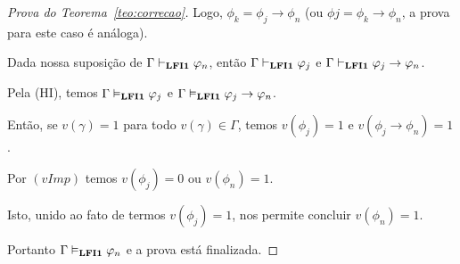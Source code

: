 \begin{proof}[Prova do Teorema~\ref{teo:correcao}]
         Logo, $\phi_{k} = \phi_{j} \to \phi_{n}$ (ou $\phi{j} = \phi_{k} \to \phi_{n}$, a prova para este caso é análoga). 
         
         Dada nossa suposição de $\Gamma \vdash_{\textbf{LFI1}{}} \varphi_{n}$, então $\Gamma \vdash_{\textbf{LFI1}{}} \varphi_{j}$ e $\Gamma \vdash_{\textbf{LFI1}{}} \varphi_{j} \to \varphi_{n}$. 
         
         Pela (HI), temos $\Gamma \vDash_{\textbf{LFI1}{}} \varphi_{j}$ e $\Gamma \vDash_{\textbf{LFI1}{}} \varphi_{j} \to \varphi_{n}$. 
         
         Então, se $v(\gamma) = 1$ para todo $v(\gamma) \in \Gamma$, temos $v(\phi_{j}) = 1$ e $v(\phi_{j} \to \phi_{n}) = 1$. 
         
         Por $(vImp)$ temos $v(\phi_{j}) = 0$ ou $v(\phi_{n}) = 1$. 
         
         Isto, unido ao fato de termos $v(\phi_{j}) = 1$, nos permite concluir $v(\phi_{n}) = 1$. 
         
         Portanto $\Gamma \vDash_{\textbf{LFI1}{}} \varphi_{n}$ e a prova está finalizada.

    \end{proof}
